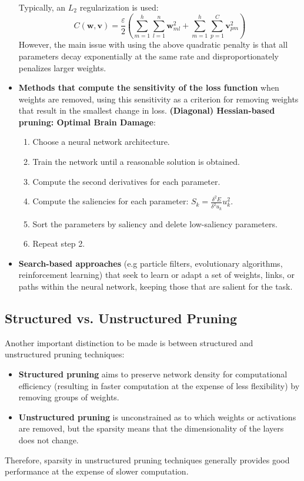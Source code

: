 \begin{itemize}
          Typically, an $L_2$ regularization is used:
          \begin{equation*}
              C(\textbf{w}, \textbf{v}) = \frac{\varepsilon}{2} \left(\sum_{m = 1}^h \sum_{l =  1}^n \textbf{w}_{ml}^2 + \sum_{m = 1}^h \sum_{p =  1}^C \textbf{v}_{pm}^2\right)
          \end{equation*}
          However, the main issue with using the above quadratic penalty is that
          all parameters decay exponentially at the same rate and disproportionately
          penalizes larger weights.
    \item \textbf{Methods that compute the sensitivity of the loss function} when
          weights are removed, using this sensitivity as a criterion for removing
          weights that result in the smallest change in loss. \textbf{(Diagonal)
              Hessian-based pruning: Optimal Brain Damage}:
          \begin{enumerate}
              \item Choose a neural network architecture.
              \item Train the network until a reasonable solution is obtained.
              \item Compute the second derivatives for each parameter.
              \item Compute the saliencies for each parameter: $S_k = \frac{\delta^2E}{\delta^2 u_k} u_k^2$.
              \item Sort the parameters by saliency and delete low-saliency parameters.
              \item Repeat step 2.
          \end{enumerate}
    \item \textbf{Search-based approaches} (e.g particle filters, evolutionary
          algorithms, reinforcement learning) that seek to learn or adapt a set
          of weights, links, or paths within the neural network, keeping those
          that are salient for the task.
\end{itemize}
\subsection{Structured vs. Unstructured Pruning}
Another important distinction to be made is between structured and unstructured
pruning techniques:
\begin{itemize}
    \item \textbf{Structured pruning} aims to preserve network density for
          computational efficiency (resulting in faster computation at the expense
          of less flexibility) by removing groups of weights.
    \item \textbf{Unstructured pruning} is unconstrained as to which weights or
          activations are removed, but the sparsity means that the dimensionality
          of the layers does not change.
\end{itemize}
Therefore, sparsity in unstructured pruning techniques generally provides good
performance at the expense of slower computation.

